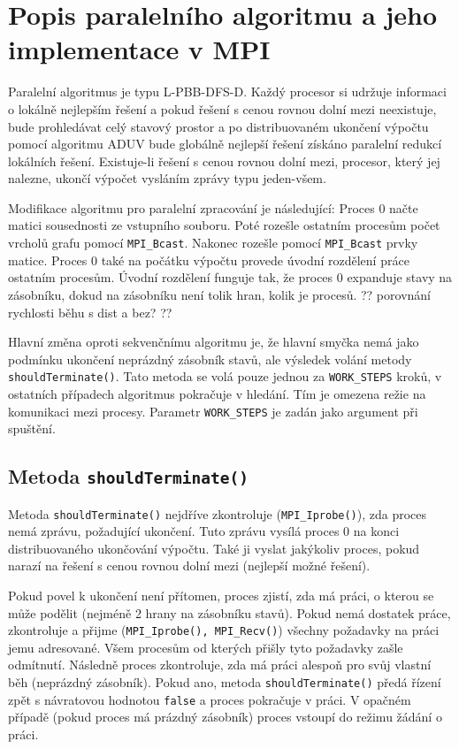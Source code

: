 \documentclass[12pt]{article}
\begin{document}
\section{Popis paralelního algoritmu a jeho implementace v MPI}

Paralelní algoritmus je typu L-PBB-DFS-D. Každý procesor si udržuje informaci o lokálně nejlepším řešení a pokud řešení s cenou rovnou dolní mezi neexistuje, bude prohledávat celý stavový prostor a po distribuovaném ukončení výpočtu pomocí algoritmu ADUV bude globálně nejlepší řešení získáno paralelní redukcí lokálních řešení. Existuje-li řešení s cenou rovnou dolní mezi, procesor, který jej nalezne, ukončí výpočet vysláním zprávy typu jeden-všem.

Modifikace algoritmu pro paralelní zpracování je následující: Proces 0 načte matici sousednosti ze vstupního souboru. Poté rozešle ostatním procesům počet vrcholů grafu pomocí \texttt{MPI\_Bcast}. Nakonec rozešle pomocí \texttt{MPI\_Bcast} prvky matice. Proces 0 také na počátku výpočtu provede úvodní rozdělení práce ostatním procesům. Úvodní rozdělení funguje tak, že proces 0 expanduje stavy na zásobníku, dokud na zásobníku není tolik hran, kolik je procesů. ?? porovnání rychlosti běhu s dist a bez? ??

Hlavní změna oproti sekvenčnímu algoritmu je, že hlavní smyčka nemá jako podmínku ukončení neprázdný zásobník stavů, ale výsledek volání metody \texttt{shouldTerminate()}. Tato metoda se volá pouze jednou za \texttt{WORK\_STEPS} kroků, v ostatních případech algoritmus pokračuje v hledání. Tím je omezena režie na komunikaci mezi procesy. Parametr \texttt{WORK\_STEPS} je zadán jako argument při spuštění.

\subsection{Metoda \texttt{shouldTerminate()}}

Metoda \texttt{shouldTerminate()} nejdříve zkontroluje (\texttt{MPI\_Iprobe()}), zda proces nemá zprávu, požadující ukončení. Tuto zprávu vysílá proces 0 na konci distribuovaného ukončování výpočtu. Také ji vyslat jakýkoliv proces, pokud narazí na řešení s cenou rovnou dolní mezi (nejlepší možné řešení). 

Pokud povel k ukončení není přítomen, proces zjistí, zda má práci, o kterou se může podělit (nejméně 2 hrany na zásobníku stavů). Pokud nemá dostatek práce, zkontroluje a přijme (\texttt{MPI\_Iprobe(), MPI\_Recv()}) všechny požadavky na práci jemu adresované. Všem procesům od kterých přišly tyto požadavky zašle odmítnutí. Následně proces zkontroluje, zda má práci alespoň pro svůj vlastní běh (neprázdný zásobník). Pokud ano, metoda \texttt{shouldTerminate()} předá řízení zpět s návratovou hodnotou \texttt{false} a proces pokračuje v práci. V opačném případě (pokud proces má prázdný zásobník) proces vstoupí do režimu žádání o práci.
 
\end{document}

